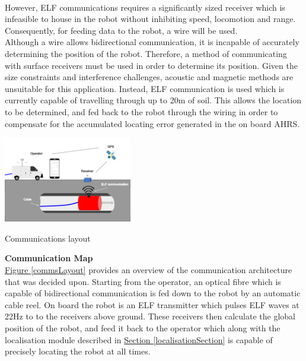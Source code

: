\documentclass[11pt]{article}		%
\newcommand{\supercite}[1]{\textsuperscript{\cite{#1}}}		%
\newcommand{\figref}[1]{\hyperref[#1]{Figure \ref*{#1}}}    %
\newcommand{\sectref}[1]{\hyperref[#1]{Section \ref*{#1}}}     %
\begin{document}
	     	However, ELF communications requires a significantly sized receiver\supercite{elfreceiversize} which is infeasible to house in the robot without inhibiting speed, locomotion and range. 
	     	Consequently, for feeding data to the robot, a wire will be used.
	        \\ 
	        \hspace*{2ex}Although a wire allows bidirectional communication, it is incapable of accurately determining the position of the robot. 
	        Therefore, a method of communicating with surface receivers must be used in order to determine its position. 
	        Given the size constraints and interference challenges, acoustic and magnetic methods are unsuitable for this application. 
	        Instead, ELF communication is used which is currently capable of travelling through up to 20m of soil. 
	        This allows the location to be determined, and fed back to the robot through the wiring in order to compensate for the accumulated locating error generated in the on board AHRS.
	        \begin{floatingfigure}[r]{0.45\textwidth}
				\centering
				\includegraphics[width=0.42\textwidth]{comms layout}
				\caption{Communications layout}
				\label{commsLayout}
			\end{floatingfigure}
    
	        \textbf{Communication Map}
	        \\
	        \figref{commsLayout} provides an overview of the communication architecture that was decided upon. 
	        Starting from the operator, an optical fibre which is capable of bidirectional communication is fed down to the robot by an automatic cable reel. 
	        On board the robot is an ELF transmitter which pulses ELF waves at 22Hz to to the receivers above ground. 
	        These receivers then calculate the global position of the robot, and feed it back to the operator which along with the localisation module described in \sectref{localisationSection} is capable of precisely locating the robot at all times.
			\begin{floatingfigure}[r]{0pt} \end{floatingfigure}
			
\end{document}
